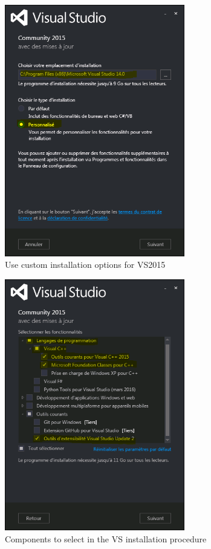 \documentclass[10pt,a4paper]{article}
\begin{document}
\begin{figure}[!htbp]
  \center
  \includegraphics[width=0.7\textwidth]{Art/vs2015-custom-install.png}
  \caption[]{Use custom installation options for VS2015}
  \label{fig:vs2015-custom-install}
\end{figure}

\begin{figure}[!htbp]
  \center
  \includegraphics[width=0.7\textwidth]{Art/vs2015-select-components.png}
  \caption[]{Components to select in the VS installation procedure}
  \label{fig:vs2015-select-components}
\end{figure}
\end{document}
